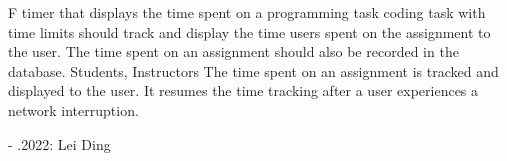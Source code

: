 \begin{myreq}
    \threeinline
    {\reqno}
    {\reqtype F}
    {}
    \reqdesc timer that displays the time spent on a programming task
    \reqrat coding task with time limits should track and display the time users spent on the assignment to the user.
    The time spent on an assignment should also be recorded in the database.
    \reqorig Students, Instructors
    \reqfit The time spent on an assignment is tracked and displayed to the user. It resumes the time tracking after a user experiences a network interruption.
    \twoinline
    {}
    {}
    \twoinline

    {}
    {}
    \reqmater -
    .2022: Lei Ding

\end{myreq}